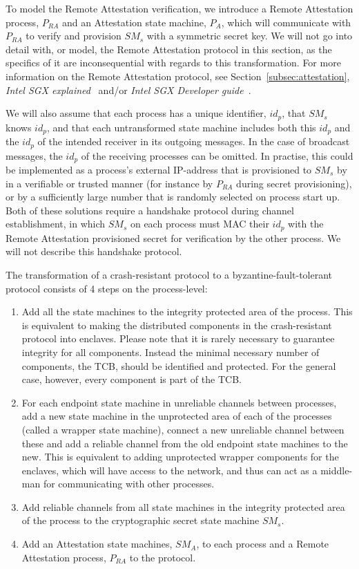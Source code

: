 \documentclass{article}
\begin{document}
	To model the Remote Attestation verification, we introduce a Remote Attestation process, $P_{RA}$ and an Attestation state machine, $P_A$, which will communicate with $P_{RA}$ to verify and provision $SM_s$ with a symmetric secret key.
	We will not go into detail with, or model, the Remote Attestation protocol in this section, as the specifics of it are inconsequential with regards to this transformation.
	For more information on the Remote Attestation protocol, see Section~\ref{subsec:attestation}, \textit{Intel SGX explained}~\cite{costan_intel_2016} and/or \textit{Intel SGX Developer guide}~\cite{intel_sgx_guide}.

	We will also assume that each process has a unique identifier, $id_p$, that $SM_s$ knows $id_p$, and that each untransformed state machine includes both this $id_p$ and the $id_p$ of the intended receiver in its outgoing messages.
	In the case of broadcast messages, the $id_p$ of the receiving processes can be omitted.
	In practise, this could be implemented as a process's external IP-address that is provisioned to $SM_s$ by in a verifiable or trusted manner (for instance by $P_{RA}$ during secret provisioning), or by a sufficiently large number that is randomly selected on process start up.
	Both of these solutions require a handshake protocol during channel establishment, in which $SM_s$ on each process must MAC their $id_p$ with the Remote Attestation provisioned secret for verification by the other process.
	We will not describe this handshake protocol.

	The transformation of a crash-resistant protocol to a byzantine-fault-tolerant protocol consists of 4 steps on the process-level:
	\begin{enumerate}
		\item Add all the state machines to the integrity protected area of the process.
		This is equivalent to making the distributed components in the crash-resistant protocol into enclaves.
		Please note that it is rarely necessary to guarantee integrity for all components.
		Instead the minimal necessary number of components, the TCB, should be identified and protected.
		For the general case, however, every component is part of the TCB.
		\item For each endpoint state machine in unreliable channels between processes, add a new state machine in the unprotected area of each of the processes (called a wrapper state machine), connect a new unreliable channel between these and add a reliable channel from the old endpoint state machines to the new. 
		This is equivalent to adding unprotected wrapper components for the enclaves, which will have access to the network, and thus can act as a middle-man for communicating with other processes.
		\item Add reliable channels from all state machines in the integrity protected area of the process to the cryptographic secret state machine $SM_s$.
		\item Add an Attestation state machines, $SM_A$, to each process and a Remote Attestation process, $P_{RA}$ to the protocol.
	\end{enumerate}
\end{document}
